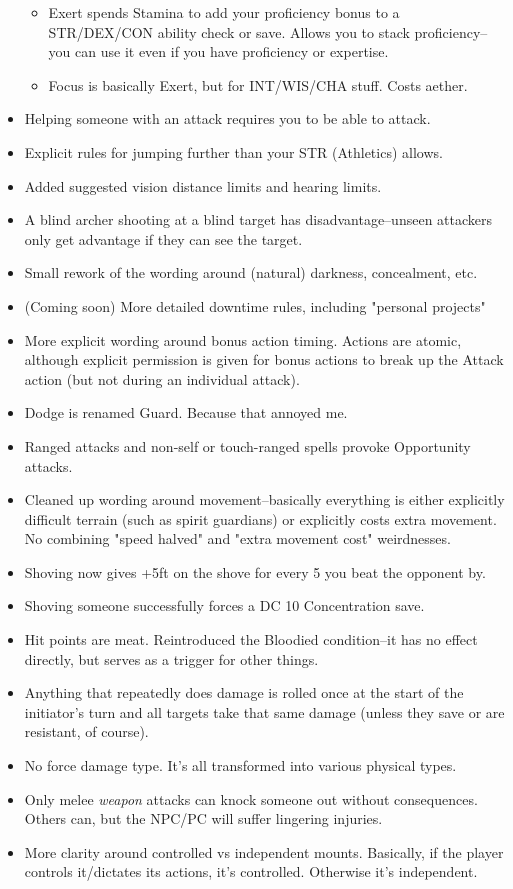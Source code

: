 \begin{itemize}
\begin{itemize}
        \item Exert spends Stamina to add your proficiency bonus to a STR/DEX/CON ability check or save. Allows you to stack proficiency--you can use it even if you have proficiency or expertise.
        \item Focus is basically Exert, but for INT/WIS/CHA stuff. Costs aether.
    \end{itemize}
    \item Helping someone with an attack requires you to be able to attack.
    \item Explicit rules for jumping further than your STR (Athletics) allows.
    \item Added suggested vision distance limits and hearing limits.
    \item A blind archer shooting at a blind target has disadvantage--unseen attackers only get advantage if they can see the target.
    \item Small rework of the wording around (natural) darkness, concealment, etc.
    \item (Coming soon) More detailed downtime rules, including "personal projects"
    \item More explicit wording around bonus action timing. Actions are atomic, although explicit permission is given for bonus actions to break up the Attack action (but not during an individual attack).
    \item Dodge is renamed Guard. Because that annoyed me.
    \item Ranged attacks and non-self or touch-ranged spells provoke Opportunity attacks.
    \item Cleaned up wording around movement--basically everything is either explicitly difficult terrain (such as spirit guardians) or explicitly costs extra movement. No combining "speed halved" and "extra movement cost" weirdnesses.
    \item Shoving now gives +5ft on the shove for every 5 you beat the opponent by.
    \item Shoving someone successfully forces a DC 10 Concentration save.
    \item Hit points are meat. Reintroduced the Bloodied condition--it has no effect directly, but serves as a trigger for other things.
    \item Anything that repeatedly does damage is rolled once at the start of the initiator's turn and all targets take that same damage (unless they save or are resistant, of course).
    \item No force damage type. It's all transformed into various physical types.
    \item Only melee \textit{weapon} attacks can knock someone out without consequences. Others can, but the NPC/PC will suffer lingering injuries.
    \item More clarity around controlled vs independent mounts. Basically, if the player controls it/dictates its actions, it's controlled. Otherwise it's independent.
\end{itemize}
